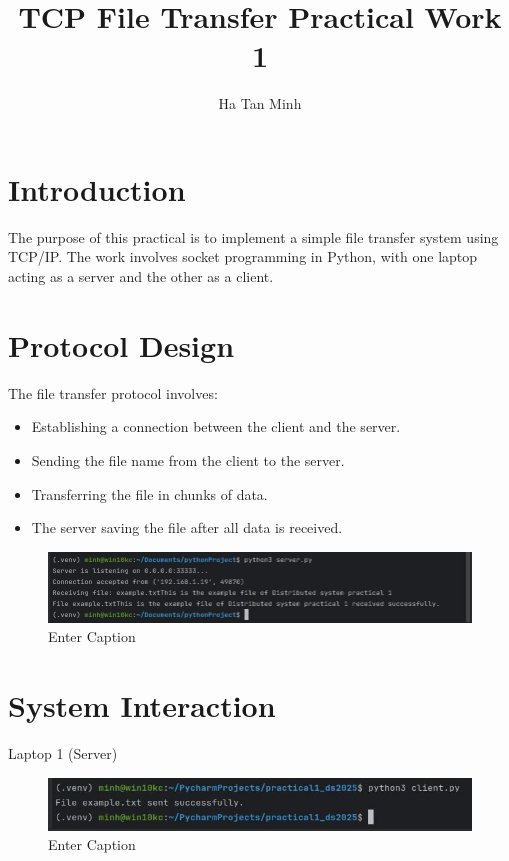 \documentclass{article}
\title{TCP File Transfer Practical Work 1}
\author{Ha Tan Minh}
\date{}
\begin{document}
\maketitle

\section{Introduction}
The purpose of this practical is to implement a simple file transfer system using TCP/IP. The work involves socket programming in Python, with one laptop acting as a server and the other as a client.

\section{Protocol Design}
The file transfer protocol involves:
\begin{itemize}
    \item Establishing a connection between the client and the server.
    \item Sending the file name from the client to the server.
    \item Transferring the file in chunks of data.
    \item The server saving the file after all data is received.
\end{itemize}
\begin{figure}
    \centering
    \includegraphics[width=1\linewidth]{a.png}
    \caption{Enter Caption}
    \label{fig:enter-label}
\end{figure}
\section{System Interaction}


\begin{center}
Laptop 1 (Server)
\end{center}

\begin{figure}
    \centering
    \includegraphics[width=1\linewidth]{b.png}
    \caption{Enter Caption}
    \label{fig:enter-label}
\end{figure}
\end{document}
